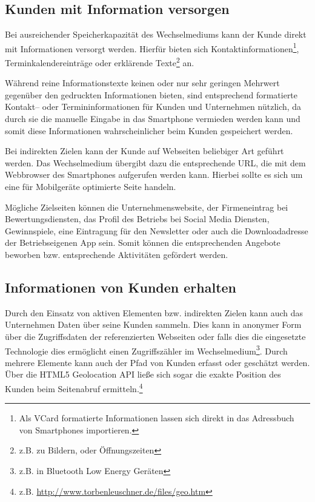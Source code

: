 \subsection{Kunden mit Information versorgen} %
\label{sub:kunde_mit_information_versorgen}
Bei ausreichender Speicherkapazität des Wechselmediums kann der Kunde direkt mit Informationen versorgt werden. Hierfür bieten sich Kontaktinformationen\footnote{Als VCard formatierte Informationen lassen sich direkt in das Adressbuch von Smartphones importieren.}, Terminkalendereinträge oder erklärende Texte\footnote{z.B. zu Bildern, oder Öffnungszeiten} an.

Während reine Informationstexte keinen oder nur sehr geringen Mehrwert gegenüber den gedruckten Informationen bieten, sind entsprechend formatierte Kontakt– oder Termininformationen für Kunden und Unternehmen nützlich, da durch sie die manuelle Eingabe in das Smartphone vermieden werden kann und somit diese Informationen wahrscheinlicher beim Kunden gespeichert werden.

Bei indirekten Zielen kann der Kunde auf Webseiten beliebiger Art geführt werden. Das Wechselmedium übergibt dazu die entsprechende \ac{URL}, die mit dem Webbrowser des Smartphones aufgerufen werden kann. Hierbei sollte es sich um eine für Mobilgeräte optimierte Seite handeln.

Mögliche Zielseiten können die Unternehmenswebsite, der Firmeneintrag bei Bewertungsdiensten, das Profil des Betriebs bei Social Media Diensten, Gewinnspiele, eine Eintragung für den Newsletter oder auch die Downloadadresse der Betriebseigenen App sein. Somit können die entsprechenden Angebote beworben bzw. entsprechende Aktivitäten gefördert werden.


\subsection{Informationen von Kunden erhalten} %
\label{sub:informationen_vom_kunden_erhalten}
Durch den Einsatz von aktiven Elementen bzw. indirekten Zielen kann auch das Unternehmen Daten über seine Kunden sammeln. Dies kann in anonymer Form über die Zugriffsdaten der referenzierten Webseiten oder falls dies die eingesetzte Technologie dies ermöglicht einen Zugriffszähler im Wechselmedium\footnote{z.B. in Bluetooth Low Energy Geräten}. Durch mehrere Elemente kann auch der Pfad von Kunden erfasst oder geschätzt werden. Über die HTML5 Geolocation \ac{API} ließe sich sogar die exakte Position des Kunden beim Seitenabruf ermitteln.\footnote{z.B. \url{http://www.torbenleuschner.de/files/geo.htm}}

